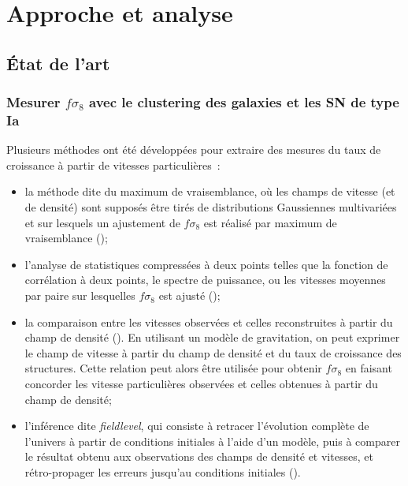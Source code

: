 \documentclass{book}
\begin{document}
\chapter{Approche et analyse}

\section{État de l'art}


\subsection{Mesurer $f\sigma_8$ avec le clustering des galaxies et les SN de type Ia}
\label{sec:art}
 Plusieurs méthodes ont été développées pour extraire des mesures du taux de croissance à partir de vitesses particulières~:
 \begin{itemize}
     \item la méthode dite du maximum de vraisemblance, où les champs de vitesse (et de densité) sont supposés être tirés de distributions Gaussiennes multivariées et sur lesquels un ajustement de $f\sigma_8$ est réalisé par maximum de vraisemblance (\cite{johnson_6df_2014, huterer_testing_2017, howlett_2mtf_2017, adams_joint_2020, lai_using_2022, carreres_growth-rate_2023});
     \item l'analyse de statistiques compressées à deux points telles que la fonction de corrélation à deux points, le spectre de puissance, ou les vitesses moyennes par paire sur lesquelles $f\sigma_8$ est ajusté (\cite{nusser_velocity-density_2017, dupuy_estimation_2019, qin_redshift_2019, turner_local_2023});
     \item la comparaison entre les vitesses observées et celles reconstruites à partir du champ de densité (\cite{davis_effect_2011, carrick_cosmological_2015, boruah_cosmic_2020, said_joint_2020, stahl_peculiar-velocity_2021}). En utilisant un modèle de gravitation, on peut exprimer le champ de vitesse à partir du champ de densité et du taux de croissance des structures. Cette relation peut alors être utilisée pour obtenir $f\sigma_8$ en faisant concorder les vitesse particulières observées et celles obtenues à partir du champ de densité;
     \item l'inférence dite \textit{fieldlevel}, qui consiste à retracer l'évolution complète de l'univers à partir de conditions initiales à l'aide d'un modèle, puis à comparer le résultat obtenu aux observations des champs de densité et vitesses, et rétro-propager les erreurs jusqu'au conditions initiales (\cite{boruah_bayesian_2022, prideaux-ghee_field-based_2023}). 
\end{itemize}
\end{document}
